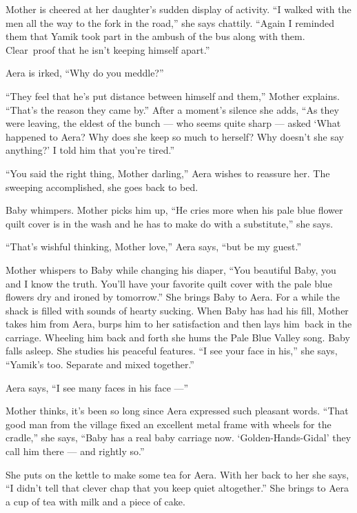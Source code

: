 \documentclass[twoside,11pt]{book}
\begin{document}
Mother is cheered at her daughter's sudden display of activity. ``I walked with the men all the way to the
fork in the road,'' she says chattily. ``Again I reminded them that Yamik took part in the
ambush of the bus along with them.  Clear~proof that he isn't keeping himself apart.''

Aera is irked, ``Why do you meddle?''

``They feel that he's put distance between himself and them,'' Mother explains.
``That's the reason they came by.'' After a moment's silence she adds, ``As they
were leaving, the eldest of the bunch --- who seems quite sharp --- asked `What happened to Aera? Why does she keep so much
to herself? Why doesn't she say anything?' I told him that you're tired.''

``You said the right thing, Mother darling,'' Aera wishes to reassure her. The sweeping
accomplished, she goes back to bed.

Baby whimpers. Mother picks him up, ``He cries more when his pale blue flower quilt cover is in the wash
and he has to make do with a substitute,'' she says.

``That's wishful thinking, Mother love,'' Aera says, ``but be my
guest.''

Mother whispers to Baby while changing his diaper, ``You beautiful Baby, you and I know the truth. You'll
have your favorite quilt cover with the pale blue flowers dry and ironed by tomorrow.'' She brings Baby
to Aera. For a while the shack is filled with sounds of hearty sucking. When Baby has had his fill, Mother takes him
from Aera, burps him to her satisfaction and then lays him~back in the carriage. Wheeling him back and forth she hums
the Pale Blue Valley song. Baby falls asleep. She studies his peaceful features. ``I see your face in
his,{}'' she says, ``Yamik's too. Separate and mixed together.''

Aera says, ``I see many faces in his face ---''

Mother thinks, it's been so long since Aera expressed such pleasant words. ``That good
man from the village fixed an excellent metal frame with wheels for the cradle,'' she says,
``Baby has a real baby carriage now. `Golden-Hands-Gidal' they call him there --- and rightly
so.''

She puts on the kettle to make some tea for Aera. With her back to her she says, ``I didn't tell that
clever chap that you keep quiet altogether.'' She brings  to Aera a cup of tea with milk and a piece of
cake.
\end{document}
